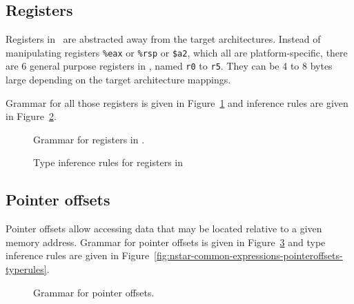 \subsection{Registers}\label{subsec:nstar-common-expressions-registers}

Registers in \nstar\ are abstracted away from the target architectures.
Instead of manipulating registers \texttt{\%eax} or \texttt{\%rsp} or \texttt{\$a2}, which all are platform-specific, there are 6 general purpose registers in \nstar, named \texttt{r0} to \texttt{r5}.
They can be 4 to 8 bytes large depending on the target architecture mappings.

Grammar for all those registers is given in Figure~\ref{fig:nstar-common-expressions-registers-grammar} and inference rules are given in Figure~\ref{fig:nstar-common-expressions-registers-typerules}.

\begin{figure}[htb]
	\centering


	\caption{Grammar for registers in \nstar.}
	\label{fig:nstar-common-expressions-registers-grammar}
\end{figure}

\begin{figure}[htb]
	\centering


	\caption{Type inference rules for registers in \nstar}
	\label{fig:nstar-common-expressions-registers-typerules}
\end{figure}

\subsection{Pointer offsets}\label{fig:nstar-common-expressions-pointeroffsets}

Pointer offsets allow accessing data that may be located relative to a given memory address.
Grammar for pointer offsets is given in Figure~\ref{fig:nstar-common-expressions-pointeroffsets-grammar} and type inference rules are given in Figure~\ref{fig:nstar-common-expressions-pointeroffsets-typerules}.

\begin{figure}[H]
	\centering


	\caption{Grammar for pointer offsets.}
	\label{fig:nstar-common-expressions-pointeroffsets-grammar}
\end{figure}

